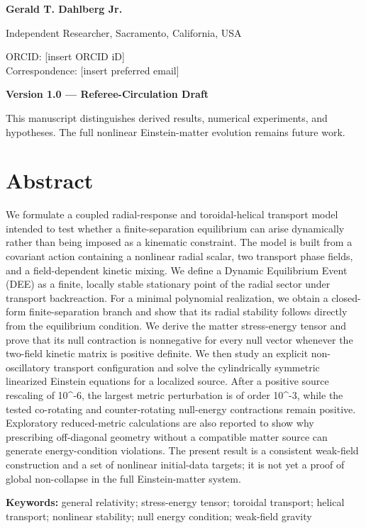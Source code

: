\textbf{Gerald T. Dahlberg Jr.}

Independent Researcher, Sacramento, California, USA

ORCID: {[}insert ORCID iD{]}\\
Correspondence: {[}insert preferred email{]}

\textbf{Version 1.0 --- Referee-Circulation Draft}

This manuscript distinguishes derived results, numerical experiments,
and hypotheses. The full nonlinear Einstein-matter evolution remains
future work.

\section{Abstract}\label{abstract}

We formulate a coupled radial-response and toroidal-helical transport
model intended to test whether a finite-separation equilibrium can arise
dynamically rather than being imposed as a kinematic constraint. The
model is built from a covariant action containing a nonlinear radial
scalar, two transport phase fields, and a field-dependent kinetic
mixing. We define a Dynamic Equilibrium Event (DEE) as a finite, locally
stable stationary point of the radial sector under transport
backreaction. For a minimal polynomial realization, we obtain a
closed-form finite-separation branch and show that its radial stability
follows directly from the equilibrium condition. We derive the matter
stress-energy tensor and prove that its null contraction is nonnegative
for every null vector whenever the two-field kinetic matrix is positive
definite. We then study an explicit non-oscillatory transport
configuration and solve the cylindrically symmetric linearized Einstein
equations for a localized source. After a positive source rescaling of
10\^{}-6, the largest metric perturbation is of order 10\^{}-3, while
the tested co-rotating and counter-rotating null-energy contractions
remain positive. Exploratory reduced-metric calculations are also
reported to show why prescribing off-diagonal geometry without a
compatible matter source can generate energy-condition violations. The
present result is a consistent weak-field construction and a set of
nonlinear initial-data targets; it is not yet a proof of global
non-collapse in the full Einstein-matter system.

\textbf{Keywords:} general relativity; stress-energy tensor; toroidal
transport; helical transport; nonlinear stability; null energy
condition; weak-field gravity

